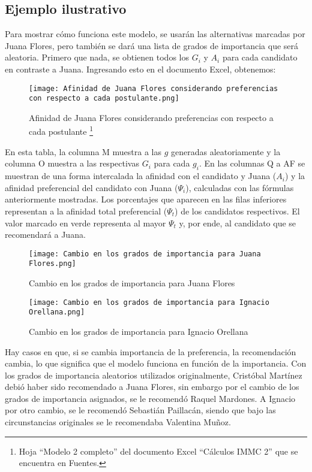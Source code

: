 \documentclass[a4paper]{article}
\begin{document}
\subsection{Ejemplo ilustrativo}
Para mostrar cómo funciona este modelo, se usarán las alternativas marcadas por Juana Flores, pero también se dará una lista de grados de importancia que será aleatoria. Primero que nada, se obtienen todos los $G_{i}$ y $A_{i}$ para cada candidato en contraste a Juana. Ingresando esto en el documento Excel, obtenemos: 
\newline 
\begin{figure}[H]
    \begin{center}
    \texttt{[image: Afinidad de Juana Flores considerando preferencias con respecto a cada postulante.png]}
\end{center}   
    \caption{Afinidad de Juana Flores considerando preferencias con respecto a cada postulante \footnote{Hoja “Modelo 2 completo” del documento Excel “Cálculos IMMC 2” que se encuentra en Fuentes.}}
\end{figure} 
En esta tabla, la columna M muestra a las $g$ generadas aleatoriamente y la columna O muestra a las respectivas $G_{i}$ para cada $g_{i}$. En las columnas Q a AF se muestran de una forma intercalada la afinidad con el candidato y Juana ($A_{i}$) y la afinidad preferencial del candidato con Juana ($\Psi_{i}$), calculadas con las fórmulas anteriormente mostradas. Los porcentajes que aparecen en las filas inferiores representan a la afinidad total preferencial ($\Psi_{t}$) de los candidatos respectivos. El valor marcado en verde representa al mayor $\Psi_{t}$  y, por ende, al candidato que se recomendará a Juana. \newline
\begin{figure}[H]
    \centering
    \texttt{[image: Cambio en los grados de importancia para Juana Flores.png]}
    \caption{Cambio en los grados de importancia para Juana Flores}
\end{figure} 
\begin{figure}[H]
    \centering
    \texttt{[image: Cambio en los grados de importancia para Ignacio Orellana.png]} 
    \caption{Cambio en los grados de importancia para Ignacio Orellana}
\end{figure} 
\newline
Hay casos en que, si se cambia importancia de la preferencia, la recomendación cambia, lo que significa que el modelo funciona en función de la importancia. Con los grados de importancia aleatorios utilizados originalmente, Cristóbal Martínez debió haber sido recomendado a Juana Flores, sin embargo por el cambio de los grados de importancia asignados, se le recomendó Raquel Mardones. A Ignacio por otro cambio, se le recomendó Sebastián Paillacán, siendo que bajo las circunstancias originales se le recomendaba Valentina Muñoz.
\end{document}
